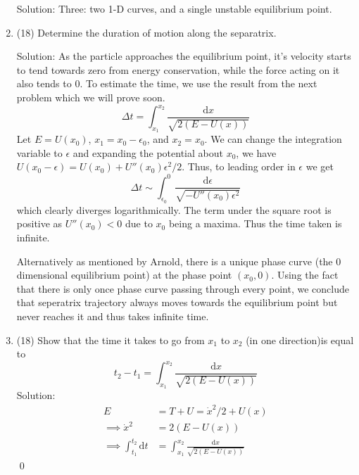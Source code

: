 \begin{enumerate}
Solution: Three: two 1-D curves, and a single unstable equilibrium point.
\item(18) Determine the duration of motion along the separatrix.\par
Solution: As the particle approaches the  equilibrium point, it's velocity starts to tend towards zero from energy conservation, while the force acting on it also tends to 0. To estimate the time, we use the result from the next problem which we will prove soon.
\begin{equation}\label{key}
	\Delta t = \int_{x_1}^{x_2}\frac{\mathrm{d}x}{\sqrt{2(E-U(x))}}
\end{equation}
Let $E = U(x_0)$, $x_1 = x_0-\epsilon_0$, and $x_2 = x_0$. We can change the integration variable to $\epsilon$ and expanding the potential about $x_0$, we have $U(x_0-\epsilon) =  U(x_0) + U''(x_0)\epsilon^2/2$. Thus, to leading order in $\epsilon$ we get
\begin{equation}\label{key}
	\Delta t \sim \int_{\epsilon_0}^{0}\frac{\mathrm{d}\epsilon}{\sqrt{-U''(x_0)\epsilon^2}}
\end{equation}
which clearly diverges logarithmically. The term under the square root is positive as $U''(x_0)<0$ due to $x_0$ being a maxima. Thus the time taken is infinite.\par
Alternatively as mentioned by Arnold, there is a unique phase curve (the 0 dimensional equilibrium point) at the phase point $(x_0, 0)$. Using the fact that there is only once phase curve passing through every point, we conclude that seperatrix trajectory always moves towards the equilibrium point but never reaches it and thus takes infinite time.

\item \label{timeprob}(18) Show that the time it takes to go from $x_1$ to $x_2$ (in one direction)is equal to
\begin{equation}\label{key}
	t_2 -t_1 = \int_{x_1}^{x_2}\frac{\mathrm{d}x}{\sqrt{2(E-U(x))}}
\end{equation}
Solution: \begin{align}
	E &= T+ U = \dot{x}^2/2+U(x)\\
	\implies \dot{x}^2& = 2(E- U(x))\\
	\implies \int_{t_1}^{t_2}\mathrm{d} t & = \int_{x_1}^{x_2}\frac{\mathrm{d}x}{\sqrt{2(E-U(x))}}
\end{align}\qed


\end{enumerate}
